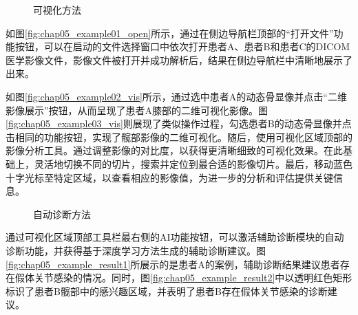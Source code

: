 \begin{figure}[htbp]
    \centering
    \newline
    \newline
    \caption{可视化方法}\label{fig:chap05_example_vis}
\end{figure}

如图\ref{fig:chap05_example01_open}所示，通过在侧边导航栏顶部的“打开文件”功能按钮，可以在启动的文件选择窗口中依次打开患者A、患者B和患者C的DICOM医学影像文件，影像文件被打开并成功解析后，结果在侧边导航栏中清晰地展示了出来。

如图\ref{fig:chap05_example02_vis}所示，通过选中患者A的动态骨显像并点击“二维影像展示”按钮，从而呈现了患者A膝部的二维可视化影像。图\ref{fig:chap05_example03_vis}则展现了类似操作过程，勾选患者B的动态骨显像并点击相同的功能按钮，实现了髋部影像的二维可视化。随后，使用可视化区域顶部的影像分析工具。通过调整影像的对比度，以获得更清晰细致的可视化效果。在此基础上，灵活地切换不同的切片，搜索并定位到最合适的影像切片。最后，移动蓝色十字光标至特定区域，以查看相应的影像值，为进一步的分析和评估提供关键信息。

\begin{figure}[b]
    \centering
    \newline
    \newline
    \caption{自动诊断方法}
    \label{fig:chap05_example_diagnose}
\end{figure}


通过可视化区域顶部工具栏最右侧的AI功能按钮，可以激活辅助诊断模块的自动诊断功能，并获得基于深度学习方法生成的辅助诊断建议。图\ref{fig:chap05_example_result1}所展示的是患者A的案例，辅助诊断结果建议患者存在假体关节感染的情况。同时，图\ref{fig:chap05_example_result2}中以透明红色矩形标识了患者B髋部中的感兴趣区域，并表明了患者B存在假体关节感染的诊断建议。

